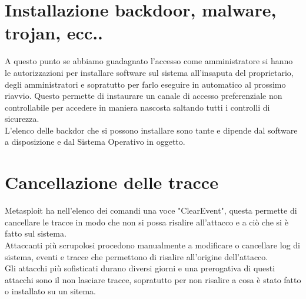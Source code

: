 \documentclass[a4paper,12pt]{article}
\begin{document}
\section{  Installazione backdoor, malware, trojan, ecc..}

A questo punto se abbiamo guadagnato l'accesso come amministratore si hanno le autorizzazioni per installare software sul sistema all'insaputa del proprietario, degli amministratori e sopratutto per farlo eseguire in automatico al prossimo riavvio. Questo permette di instaurare un canale di accesso preferenziale non controllabile per accedere in maniera nascosta saltando tutti i controlli di sicurezza. \\
L'elenco delle backdor che si possono installare sono tante e dipende dal software a disposizione e dal Sistema Operativo in oggetto.

\section{  Cancellazione delle tracce}

Metasploit\cite{metasploit} ha nell'elenco dei comandi una voce "ClearEvent", questa permette di cancellare le tracce in modo che non si possa risalire all'attacco e a ciò che si è fatto sul sistema.\\
Attaccanti più scrupolosi procedono manualmente  a modificare o cancellare log di sistema, eventi e tracce che permettono di risalire all'origine dell'attacco.\\
Gli attacchi più sofisticati durano diversi giorni e una prerogativa di questi attacchi sono il non lasciare tracce, sopratutto per non risalire a cosa è stato fatto o installato su un sitema.
\end{document}

